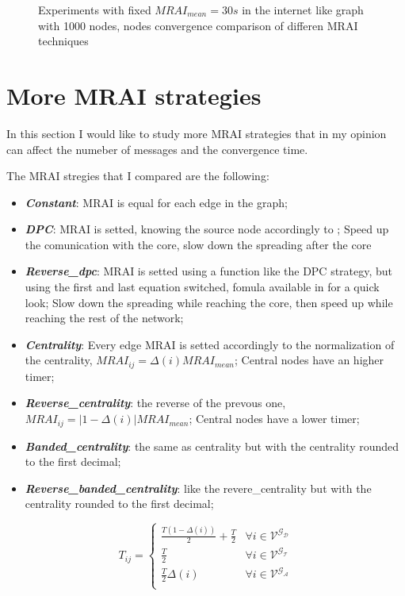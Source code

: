 \documentclass[10pt,conference,letterpaper]{IEEEtran}
\newcommand{\figvspace}{-1.5em}
\newcommand{\ascentg}{\ensuremath{\mathcal{G_{A}}\xspace}}
\newcommand{\ascentnodeset}{\ensuremath{\mathcal{V^{\ascentg}}}\xspace}
\newcommand{\dpc}{\ensuremath{\Delta}\xspace}
\newcommand{\tierg}{\ensuremath{\mathcal{G_{T}}\xspace}}
\newcommand{\tiernodeset}{\ensuremath{\mathcal{V^{\tierg}}}\xspace}
\newcommand{\descentg}{\ensuremath{\mathcal{G_{D}}\xspace}}
\newcommand{\descentnodeset}{\ensuremath{\mathcal{V^{\descentg}}}\xspace}
\begin{document}
\begin{figure}[tb]
	\caption{Experiments with fixed $MRAI_{mean} = 30s$ in the internet like graph with \ac{1000}
			nodes, nodes convergence comparison of differen \ac{MRAI} techniques
			}
	\label{fig:s_aw_converged_nodes_1000}
	\vspace{\figvspace}
\end{figure}

\clearpage

\section{More MRAI strategies}

In this section I would like to study more \ac{MRAI} strategies that in my opinion
can affect the numeber of messages and the convergence time.

The \ac{MRAI} stregies that I compared are the following:
\begin{itemize}
	\item \textbf{\textit{Constant}}: \ac{MRAI} is equal for each edge in the graph;
	\item \textbf{\textit{DPC}}: \ac{MRAI} is setted, knowing the source node accordingly
		to ;
		Speed up the comunication with the core, slow down the spreading after the core
	\item \textbf{\textit{Reverse\_dpc}}: \ac{MRAI} is setted using a function like the
		DPC strategy, but using the first and last equation switched, fomula available
		in  for a quick look;
		Slow down the spreading while reaching the core, then speed up while
		reaching the rest of the network;
	\item \textbf{\textit{Centrality}}: Every edge \ac{MRAI} is setted accordingly
		to the normalization of the centrality, $MRAI_{ij} = \dpc(i)MRAI_{mean}$;
		Central nodes have an higher timer;
	\item \textbf{\textit{Reverse\_centrality}}: the reverse of the prevous one,
		 $MRAI_{ij} = |1-\dpc(i)|MRAI_{mean}$;
		 Central nodes have a lower timer;
	\item \textbf{\textit{Banded\_centrality}}: the same as centrality but with
		the centrality rounded to the first decimal;
	\item \textbf{\textit{Reverse\_banded\_centrality}}: like the revere\_centrality
		but with the centrality rounded to the first decimal;
\end{itemize}

\begin{equation} \label{eq:reverse_dpc}
    T_{ij}=
    \begin{cases}
		\frac{T(1-\dpc(i))}{2}+\frac{T}{2} & \forall i\in \descentnodeset\\
		\frac{T}{2} & \forall i\in \tiernodeset \\
		\frac{T}{2}\dpc(i) & \forall i\in \ascentnodeset  \\
    \end{cases}
\end{equation} 
\end{document}
